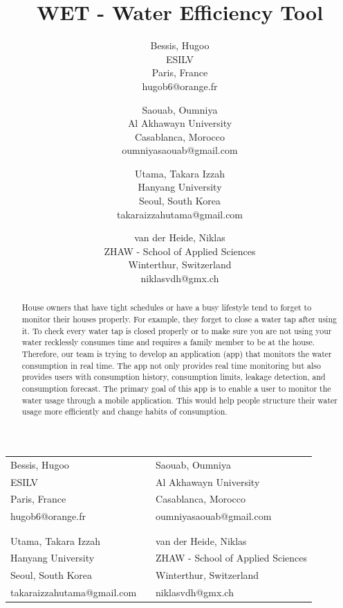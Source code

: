 \documentclass[10pt]{article}
\title{WET - Water Efficiency Tool }
\author{
  Bessis, Hugoo\\
  ESILV\\
  Paris, France\\
  hugob6@orange.fr
  \and
  Saouab, Oumniya\\
  Al Akhawayn University\\
  Casablanca, Morocco\\
  oumniyasaouab@gmail.com
  \and
  Utama, Takara Izzah\\
  Hanyang University\\
  Seoul, South Korea\\
  takaraizzahutama@gmail.com
  \and
  van der Heide, Niklas\\
  ZHAW - School of Applied Sciences\\
  Winterthur, Switzerland\\
  niklasvdh@gmx.ch
}
\begin{document}
\maketitle

\begin{table}[H]
  \centering
  \begin{tabular}{P{5.5cm}P{1cm}P{5.5cm}}
    Bessis, Hugoo & & Saouab, Oumniya \\
    ESILV & & Al Akhawayn University \\
    Paris, France & & Casablanca, Morocco \\
    hugob6@orange.fr & & oumniyasaouab@gmail.com \\
     & &  \\
     & &  \\
    Utama, Takara Izzah & & van der Heide, Niklas \\
    Hanyang University & & ZHAW - School of Applied Sciences \\
    Seoul, South Korea & & Winterthur, Switzerland \\
    takaraizzahutama@gmail.com & & niklasvdh@gmx.ch \\
  \end{tabular}
\end{table}

\vspace{1cm}

\begin{abstract}
House owners that have tight schedules or have a busy lifestyle tend to forget to monitor their houses properly. For example, they forget to close a water tap after using it. To check every water tap is closed properly or to make sure you are not using your water recklessly consumes time and requires a family member to be at the house. Therefore, our team is trying to develop an application (app) that monitors the water consumption in real time. The app not only provides real time monitoring but also provides users with consumption history, consumption limits, leakage detection, and consumption forecast. The primary goal of this app is to enable a user to monitor the water usage through a mobile application. This would help people structure their water usage more efficiently and change habits of consumption.
\end{abstract}

\clearpage
\end{document}
